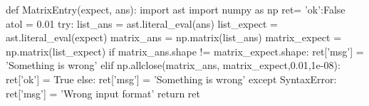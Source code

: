 \begin{edXscript}
def MatrixEntry(expect, ans):
  	import ast
	import numpy as np 
	ret= {'ok':False}
  	atol = 0.01
  	try:
		list_ans = ast.literal_eval(ans)
		list_expect = ast.literal_eval(expect)
  		matrix_ans = np.matrix(list_ans)
  		matrix_expect = np.matrix(list_expect) 
  		if matrix_ans.shape != matrix_expect.shape:
  			ret['msg'] = 'Something is wrong'
  		elif np.allclose(matrix_ans, matrix_expect,0.01,1e-08):
  			ret['ok'] = True
  		else:
  			ret['msg'] = 'Something is wrong'
	except SyntaxError:
		ret['msg'] = 'Wrong input format'
  	return ret
\end{edXscript}
